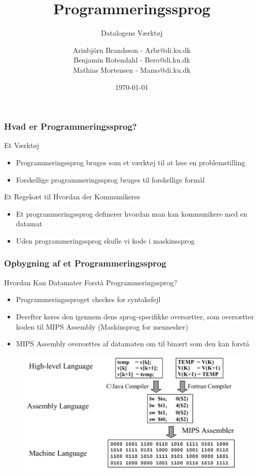 \documentclass[12pt,t]{beamer}
\title{Programmeringssprog}
\subtitle{Datalogens Værktøj}
\author{
        Arinbjörn Brandsson - Arbr@di.ku.dk \\
        Benjamin Rotendahl - Bero@di.ku.dk\\
        Mathias Mortensen - Mamo@di.ku.dk
}
\date[]{\today}
\begin{document}
\frame[nat]{\titlepage}

\begin{frame}
\frametitle{Hvad er Programmeringssprog?}
\begin{block}{Et Værktøj}
\begin{itemize}
\item Programmeringssprog bruges som et værktøj til at løse en problemstilling\\
\item Forskellige programmeringssprog bruges til forskellige formål
\end{itemize}
\end{block}
\begin{block}{Et Regelsæt til Hvordan der Kommunikeres}
\begin{itemize}
\item Et programmeringssprog definerer hvordan man kan kommunikere med 
en datamat\\
\item Uden programmeringssprog skulle vi kode i maskinssprog
\end{itemize}
\end{block}
\end{frame}

\begin{frame}
\frametitle{Opbygning af et Programmeringssprog}
\begin{block}{Hvordan Kan Datamater Forstå Programmeringssprog?}
\begin{itemize}
\item Programmeringssproget checkes for syntaksfejl\\
\item Derefter køres den igennem dens sprog-specifikke oversætter, 
som oversætter koden til MIPS Assembly (Maskinsprog for mennesker)\\
\item MIPS Assembly oversættes af datamaten om til binært som den kan forstå
\end{itemize}
\end{block}
\begin{figure}[h]
\centering
\includegraphics[scale=0.25]{Img/LangToMachine.pdf}
\end{figure}
\end{frame}
\end{document}
